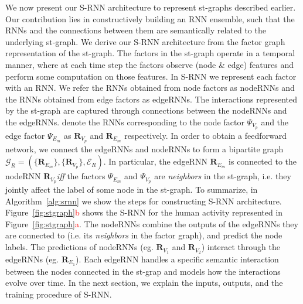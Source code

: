 \documentclass[10pt,twocolumn,letterpaper]{article}
\newcommand{\ve}[1]{\mathbf{#1}}
\newcommand{\mcal}[1]{\mathcal{#1}}
\newcommand{\rc}[1]{\textcolor{red}{#1}}
\begin{document}
\iffalse
We now present our S-RNN architecture to represent st-graphs described earlier.  Our contribution lies in constructively building an RNN ensemble, such that the RNNs and the connections between them are semantically related to the underlying st-graph. %
We derive our S-RNN architecture from the factor graph representation of the st-graph. The factors in the st-graph operate in a temporal manner, where at each time step the factors observe (node \& edge) features and perform some computation on those features. In S-RNN we represent each factor with an RNN. We refer the RNNs obtained from node factors as nodeRNNs and the RNNs obtained from edge factors as edgeRNNs. The interactions represented by the st-graph are captured through connections between the nodeRNNs and the edgeRNNs. 
\fiWe denote the RNNs corresponding to the node factor $\Psi_{V_p}$ and the edge factor $\Psi_{E_m}$ as  $\ve{R}_{V_p}$ and $\ve{R}_{E_m}$ respectively. In order to obtain a feedforward network, we connect the edgeRNNs and nodeRNNs to form a bipartite graph $\mcal{G}_R = (\{\ve{R}_{E_m}\},\{\ve{R}_{V_p}\},\mcal{E}_R)$. In particular, the edgeRNN $\ve{R}_{E_m}$ is connected to the nodeRNN $\ve{R}_{V_p}$\textit{iff} the factors $\Psi_{E_m}$  and $\Psi_{V_p}$ are \textit{neighbors} in the st-graph, i.e. they jointly affect the label of some node in the st-graph. To summarize, in Algorithm~\ref{alg:srnn} we show the steps for constructing S-RNN architecture. 
Figure~\ref{fig:stgraph}\rc{b} shows the S-RNN for the human activity represented in  Figure~\ref{fig:stgraph}\rc{a}. The nodeRNNs combine the outputs of the edgeRNNs they are connected to (i.e. its \textit{neighbors} in the factor graph), and predict the node labels. The predictions of nodeRNNs (eg. $\ve{R}_{V_1}$ and $\ve{R}_{V_2}$) interact through the edgeRNNs (eg. $\ve{R}_{E_1}$).  Each edgeRNN handles a specific semantic interaction between the nodes connected in the st-grap and models how the interactions evolve over time. In the next section, we explain the inputs, outputs, and the training procedure of S-RNN.
\end{document}
